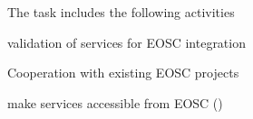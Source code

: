 \begin{task}[
  title=Collaboration with EOSC,
  id=eosc,
  lead=EGI,
  PM=24,
  wphases={12-48},
  partners={SRL,XFEL,WTT}
]
  The task includes the following activities

  \begin{compactitem}
  \item validation of services for EOSC integration
  \item Cooperation with existing EOSC projects
  \item make services accessible from EOSC
    ()
  \end{compactitem}
\end{task}
